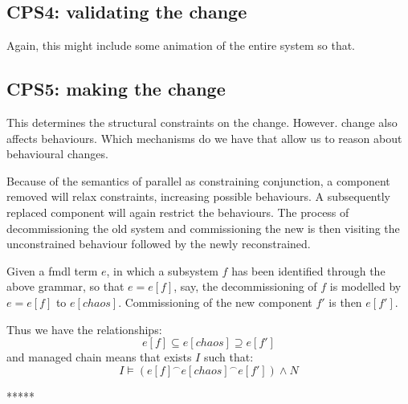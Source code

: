 \documentclass[runningheads,a4paper]{llncs}
\begin{document}
\subsection{CPS4: validating the change}

Again, this might include some animation of the entire system so that.

\subsection{CPS5: making the change}

This determines the structural constraints on the change. However. change also affects behaviours. Which mechanisms do we have that allow us to reason about behavioural changes.

Because of the semantics of parallel as constraining conjunction, a component removed will relax constraints, increasing possible behaviours. A subsequently replaced component will again restrict the behaviours. The process of decommissioning the old system and commissioning the new is then visiting the unconstrained behaviour followed by the newly reconstrained.

Given a fmdl term $e$, in which a subsystem $f$ has been identified through the above grammar, so that $e = e[f]$, say, the decommissioning of $f$ is modelled by $e = e[f]$ to $e[chaos]$. Commissioning of the new component $f'$ is then $e[f']$.

Thus we have the relationships:
%
\[e[f]\subseteq e[chaos]\supseteq e[f']\]
%
and managed chain means that exists $I$ such that:
%
\[I\models (e[f]^\frown e[chaos]^\frown e[f'])\land N\]

*****
\end{document}
